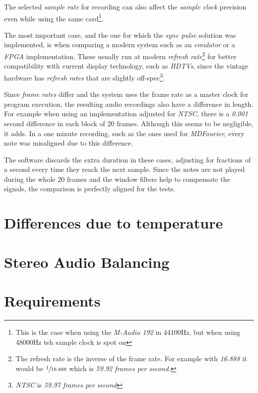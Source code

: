 \documentclass[10pt,a4paper]{report}
\begin{document}
\begin{appendices}
The selected \textit{sample rate} for recording can also affect the \textit{sample clock} precision even while using the same card\footnote{This is the case when using the \textit{M-Audio 192} \cite{maudio} in 44100Hz, but when using 48000Hz teh sample clock is spot on}.

The most important case, and the one for which the \textit{sync pulse} solution was implemented, is when comparing a modern system such as an \textit{emulator} or a \textit{FPGA} implementation. These usually run at modern \textit{refresh rate}\footnote{The refresh rate is the inverse of the frame rate. For example with \textit{16.888} it would be $\sfrac{1}{16.888}$ which is \textit{59.92 frames per second}.} for better compatibility with current display technology, such as \textit{HDTVs}, since the vintage hardware has \textit{refresh rates} that are slightly off-spec\footnote{\textit{NTSC} is \textit{59.97 frames per second}}.

Since \textit{frame rates} differ and the system uses the frame rate as a master clock for program execution, the resulting audio recordings also have a difference in length. For example when using an implementation adjusted for \textit{NTSC}, there is a \textit{0.001} second difference in each block of 20 frames. Although this seems to be negligible, it adds. In a one minute recording, such as the ones used for \textit{MDFourier}, every note was misaligned due to this difference.

The software discards the extra duration in these cases, adjusting for fractions of a second every time they reach the next sample. Since the notes are not played during the whole 20 frames and the window filters help to compensate the signals, the comparison is perfectly aligned for the tests.

\chapter{Differences due to temperature}

\chapter{Stereo Audio Balancing}	

\chapter{}	

\chapter{Requirements}
\label{requirements}

\end{appendices}
\end{document}
